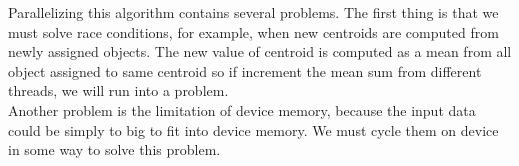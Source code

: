 Parallelizing this algorithm contains several problems. The first thing is that we must solve race conditions, for example, when new centroids are computed from newly assigned objects. The new value of centroid is computed as a mean from all object assigned to same centroid so if increment the mean sum from different threads, we will run into a problem.\\
Another problem is the limitation of device memory, because the input data could be simply to big to fit into device memory. We must cycle them on device in some way to solve this problem.
\\



